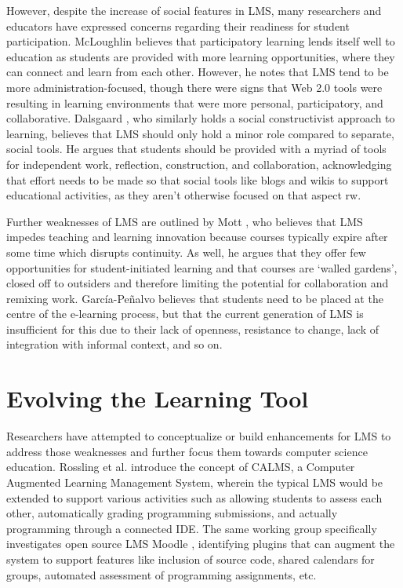 \begin{itemize}
However, despite the increase of social features in LMS, many researchers and educators have expressed concerns regarding their readiness for student participation. McLoughlin \cite{mcloughlin2007social} believes that participatory learning lends itself well to education as students are provided with more learning opportunities, where they can connect and learn from each other. However, he notes that LMS tend to be more administration-focused, though there were signs that Web 2.0 tools were resulting in learning environments that were more personal, participatory, and collaborative. Dalsgaard \cite{dalsgaard2006social}, who similarly holds a social constructivist approach to learning, believes that LMS should only hold a minor role compared to separate, social tools. He argues that students should be provided with a myriad of tools for independent work, reflection, construction, and collaboration, acknowledging that effort needs to be made so that social tools like blogs and wikis to support educational activities, as they aren't otherwise focused on that aspect {rw}.

Further weaknesses of LMS are outlined by Mott \cite{mott2010envisioning}, who believes that LMS impedes teaching and learning innovation because courses typically expire after some time which disrupts continuity. As well, he argues that they offer few opportunities for student-initiated learning and that courses are ‘walled gardens’, closed off to outsiders and therefore limiting the potential for collaboration and remixing work. García-Peñalvo \cite{garcia2011opening} believes that students need to be placed at the centre of the e-learning process, but that the current generation of LMS is insufficient for this due to their lack of openness, resistance to change, lack of integration with informal context, and so on.

\section{Evolving the Learning Tool}

Researchers have attempted to conceptualize or build enhancements for LMS to address those weaknesses and further focus them towards computer science education. Rossling et al. \cite{rossling2008enhancing} introduce the concept of CALMS, a Computer Augmented Learning Management System, wherein the typical LMS would be extended to support various activities such as allowing students to assess each other, automatically grading programming submissions, and actually programming through a connected IDE. The same working group specifically investigates open source LMS Moodle \cite{rossling2010adapting}, identifying plugins that can augment the system to support features like inclusion of source code, shared calendars for groups, automated assessment of programming assignments, etc.


\end{itemize}
